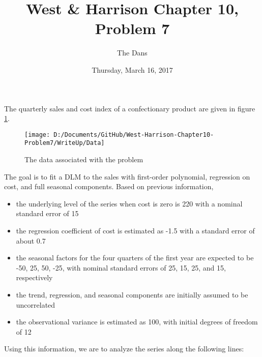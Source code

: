 \documentclass{article}
\title{West \& Harrison Chapter 10, Problem 7}
\author{The Dans}
\date{Thursday, March 16, 2017}
\begin{document}
	\maketitle
	
	The quarterly sales and cost index of a confectionary product are given in figure \ref{fig:data}.
	\begin{figure}[h]
		\centering
		\texttt{[image: D:/Documents/GitHub/West-Harrison-Chapter10-Problem7/WriteUp/Data]}
		\caption{The data associated with the problem}
		\label{fig:data}
	\end{figure}
	The goal is to fit a DLM to the sales with first-order polynomial, regression on cost, and full seasonal components. Based on previous information, 
	\begin{itemize}
		\item the underlying level of the series when cost is zero is 220 with a nominal standard error of 15
		\item the regression coefficient of cost is estimated as -1.5 with a standard error of about 0.7
		\item the seasonal factors for the four quarters of the first year are expected to be -50, 25, 50, -25, with nominal standard errors of 25, 15, 25, and 15, respectively
		\item the trend, regression, and seasonal components are initially assumed to be uncorrelated
		\item the observational variance is estimated as 100, with initial degrees of freedom of 12
	\end{itemize}
	Using this information, we are to analyze the series along the following lines:
\end{document}
